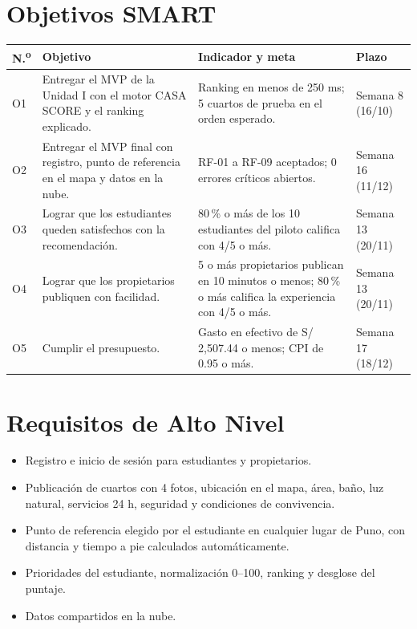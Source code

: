 \documentclass[11pt,a4paper]{article}
\begin{document}
\section{Objetivos SMART}
{\small
\noindent\begin{tabularx}{\textwidth}{@{}C{0.7cm} L L P{2.4cm}@{}}
\toprule
{}
\textbf{N.\textsuperscript{o}} & \textbf{Objetivo} & \textbf{Indicador y meta} & \textbf{Plazo} \\
\midrule
O1 & Entregar el MVP de la Unidad I con el motor CASA SCORE y el ranking explicado. & Ranking en menos de 250 ms; 5 cuartos de prueba en el orden esperado. & Semana 8 (16/10) \\
O2 & Entregar el MVP final con registro, punto de referencia en el mapa y datos en la nube. & RF-01 a RF-09 aceptados; 0 errores críticos abiertos. & Semana 16 (11/12) \\
O3 & Lograr que los estudiantes queden satisfechos con la recomendación. & 80\,\% o más de los 10 estudiantes del piloto califica con 4/5 o más. & Semana 13 (20/11) \\
O4 & Lograr que los propietarios publiquen con facilidad. & 5 o más propietarios publican en 10 minutos o menos; 80\,\% o más califica la experiencia con 4/5 o más. & Semana 13 (20/11) \\
O5 & Cumplir el presupuesto. & Gasto en efectivo de S/ 2,507.44 o menos; CPI de 0.95 o más. & Semana 17 (18/12) \\
\bottomrule
\end{tabularx}
}

\section{Requisitos de Alto Nivel}
\begin{itemize}[leftmargin=*]
    \item Registro e inicio de sesión para estudiantes y propietarios.
    \item Publicación de cuartos con 4 fotos, ubicación en el mapa, área, baño, luz natural, servicios 24 h, seguridad y condiciones de convivencia.
    \item Punto de referencia elegido por el estudiante en cualquier lugar de Puno, con distancia y tiempo a pie calculados automáticamente.
    \item Prioridades del estudiante, normalización 0--100, ranking y desglose del puntaje.
    \item Datos compartidos en la nube.
\end{itemize}
\end{document}
